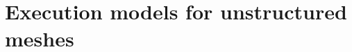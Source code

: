 \documentclass[thesis]{subfiles}
\begin{document}
\section{Execution models for unstructured meshes}







\end{document}
